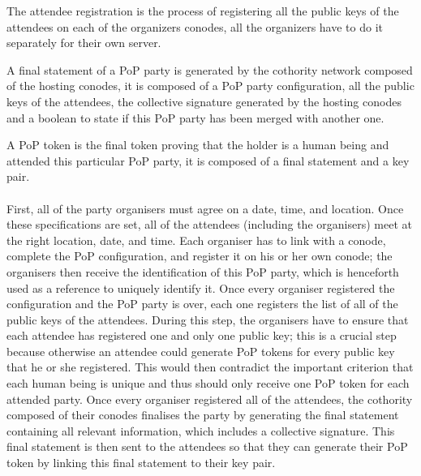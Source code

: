 \begin{description}[style=nextline]
\item[Attendee Registration] The attendee registration is the process of registering all the public keys of the attendees on each of the organizers conodes, all the organizers have to do it separately for their own server.

\item[Final Statement] A final statement of a PoP party is generated by the cothority network composed of the hosting conodes, it is composed of a PoP party configuration, all the public keys of the attendees, the collective signature generated by the hosting conodes and a boolean to state if this PoP party has been merged with another one.

\item[PoP Token] A PoP token is the final token proving that the holder is a human being and attended this particular PoP party, it is composed of a final statement and a key pair.
\end{description}

\paragraph{}
First, all of the party organisers must agree on a date, time, and location. Once these specifications are set, all of the attendees (including the organisers) meet at the right location, date, and time. Each organiser has to link with a conode, complete the PoP configuration, and register it on his or her own conode; the organisers then receive the identification of this PoP party, which is henceforth used as a reference to uniquely identify it. Once every organiser registered the configuration and the PoP party is over, each one registers the list of all of the public keys of the attendees. During this step, the organisers have to ensure that each attendee has registered one and only one public key; this is a crucial step because otherwise an attendee could generate PoP tokens for every public key that he or she registered. This would then contradict the important criterion that each human being is unique and thus should only receive one PoP token for each attended party. Once every organiser registered all of the attendees, the cothority composed of their conodes finalises the party by generating the final statement containing all relevant information, which includes a collective signature. This final statement is then sent to the attendees so that they can generate their PoP token by linking this final statement to their key pair.

